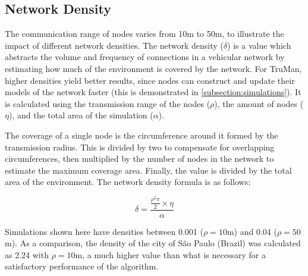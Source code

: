 \documentclass[conference]{IEEEtran}
\begin{document}
\subsection{Network Density}


The communication range of nodes varies from 10m to 50m, to illustrate the impact of different network densities.
The network density ($\delta$) is a value which abstracts the volume and frequency of connections in a vehicular network by estimating how much of the environment is covered by the network.
For TruMan, higher densities yield better results, since nodes can construct and update their models of the network faster (this is demonstrated in \autoref{subsection:simulations}).
It is calculated using the transmission range of the nodes ($\rho$), the amount of nodes ($\eta$), and the total area of the simulation ($\alpha$).

The coverage of a single node is the circumference around it formed by the transmission radius. This is divided by two to compensate for overlapping circumferences, then multiplied by the number of nodes in the network to estimate the maximum coverage area.
Finally, the value is divided by the total area of the environment.
The network density formula is as follows:

$$ \delta = \frac{\frac{\rho^2\pi}{2} \times \eta}{\alpha} $$

Simulations shown here have densities between 0.001 ($\rho = 10$m) and 0.04 ($\rho = 50$m).
As a comparison, the density of the city of São Paulo (Brazil) was calculated as 2.24 with $\rho = 10$m, a much higher value than what is necessary for a satisfactory performance of the algorithm.
\end{document}
